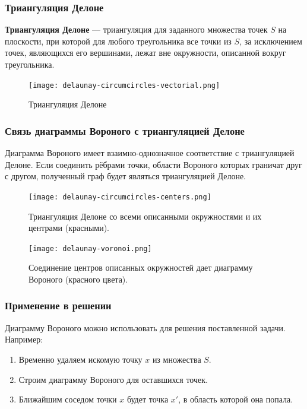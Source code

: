 \newpage

\subsubsection*{Триангуляция Делоне}

\textbf{Триангуляция Делоне} — триангуляция для заданного множества точек $S$ на плоскости, при которой для любого треугольника все точки из $S$, за исключением точек, являющихся его вершинами, лежат вне окружности, описанной вокруг треугольника.

\begin{figure}[H]
    \centering
    \texttt{[image: delaunay-circumcircles-vectorial.png]}
    \caption{Триангуляция Делоне}
\end{figure}

\newpage

\subsubsection*{Связь диаграммы Вороного с триангуляцией Делоне}

Диаграмма Вороного имеет взаимно-однозначное соответствие с триангуляцией Делоне. Если соединить рёбрами точки, области Вороного которых граничат друг с другом, полученный граф будет являться триангуляцией Делоне.

\begin{figure}[H]
    \begin{center}
        \begin{minipage}[h]{0.45\linewidth}
            \texttt{[image: delaunay-circumcircles-centers.png]}
            \caption{Триангуляция Делоне со всеми описанными окружностями и их центрами (красными).}
        \end{minipage}
        \hfill
        \begin{minipage}[h]{0.45\linewidth}
            \texttt{[image: delaunay-voronoi.png]}
            \caption{Соединение центров описанных окружностей дает диаграмму Вороного (красного цвета).}
        \end{minipage}
    \end{center}
\end{figure}

\subsubsection*{Применение в решении}

Диаграмму Вороного можно использовать для решения поставленной задачи. Например:
\begin{enumerate}
    \item Временно удаляем искомую точку $x$ из множества $S$.
    \item Строим диаграмму Вороного для оставшихся точек.
    \item Ближайшим соседом точки $x$ будет точка $x'$, в область которой она попала.
\end{enumerate}

